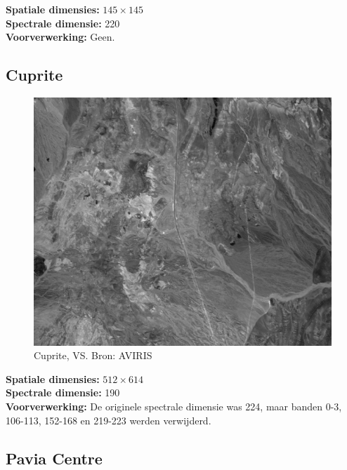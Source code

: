 \textbf{Spatiale dimensies:} $145 \times 145$\\
\textbf{Spectrale dimensie:} 220\\
\textbf{Voorverwerking:} Geen.

\newpage
\subsection{Cuprite}

\begin{figure}[H]
  \centering
  \includegraphics[scale=0.5]{images/cuprite_sum.png}
  \caption{Cuprite, VS. Bron: AVIRIS \cite{ref:ehu_aviris}}
  \label{fig:cuprite_sum}
\end{figure}

\textbf{Spatiale dimensies:} $512 \times 614$\\
\textbf{Spectrale dimensie:} 190\\
\textbf{Voorverwerking:} De originele spectrale dimensie was 224, maar banden 0-3, 106-113, 152-168 en 219-223 werden verwijderd.

\newpage
\subsection{Pavia Centre}

